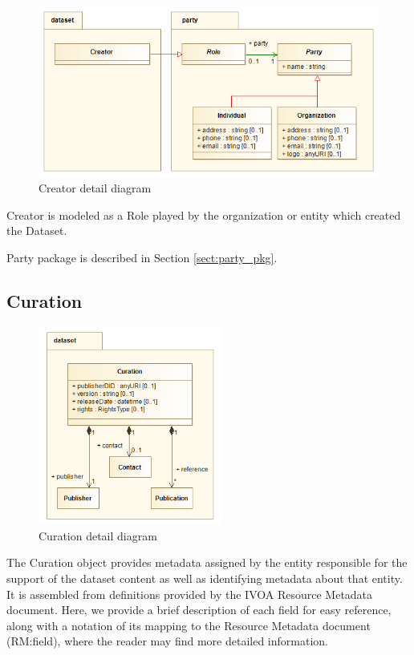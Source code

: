   \begin{figure}[h]
  \begin{center}
    \includegraphics[width=4.75in]{diagrams/Creator.png}
    \caption{Creator detail diagram}\label{fig:creator}
  \end{center}
  \end{figure}

  Creator is modeled as a Role played by the organization or entity which
  created the Dataset.

  Party package is described in Section \ref{sect:party_pkg}.
  
\pagebreak
\subsection{Curation}
\label{sect:curation}

  \begin{figure}[h]
  \begin{center}
    \includegraphics[width=2.375in]{diagrams/Curation.png}
    \caption{Curation detail diagram}\label{fig:curation}
  \end{center}
  \end{figure}

  The Curation object provides metadata assigned by the entity responsible for
  the support of the dataset content as well as identifying metadata about that
  entity. It is assembled from definitions provided by the IVOA Resource
  Metadata document. Here, we provide a brief description of each field for easy
  reference, along with a notation of its mapping to the Resource Metadata
  document (RM:field), where the reader may find more detailed information.


